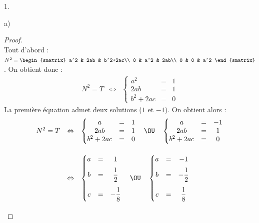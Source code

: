 \documentclass[11pt]{article}%
\begin{document}
\begin{noliste}{1.}
\begin{noliste}{a)}
    \begin{proof}~\\
      Tout d'abord : $N^2=
      \begin{smatrix}
        a^2 &  2ab &  b^2+2ac\\ 
        0 &  a^2 &  2ab\\ 
        0 &  0 &  a^2 
      \end{smatrix}$. On obtient donc :
      \[
      \begin{array}{rcl}
        N^2=T & \Leftrightarrow & \left\{
          \begin{matrix}
            a^2 & = & 1\\
            2ab & = & 1\\
            b^2+2ac & = & 0
          \end{matrix}
        \right.
      \end{array}
      \]
      La première équation admet deux solutions ($1$ et $-1$). On 
      obtient alors :~\\[-.2cm]
      \[
      \begin{array}{rcl}
        N^2=T & \Leftrightarrow & \left\{
          \begin{matrix}
            a & = & 1\\
            2ab & = &  1\\
            b^2+2ac & = & 0
          \end{matrix}
        \right. \quad \OU \quad \left\{
          \begin{matrix}
            a & = &  -1\\
            2ab & = & 1\\
            b^2+2ac & = &  0
          \end{matrix}
        \right.
        \\[1cm]
        & \Leftrightarrow & \left\{
          \begin{matrix}
            a & = & 1\\[.2cm]
            b & = & \dfrac{1}{2}\\[.4cm]
            c & = & -\dfrac{1}{8}
          \end{matrix}
        \right. \quad \OU \quad \left\{
          \begin{matrix}
            a & = &  -1\\[.2cm]
            b & = & -\dfrac{1}{2}\\[.4cm]
            c & = & \dfrac{1}{8}
          \end{matrix}
        \right.
        \\[1.2cm]

\end{array}\]
\end{proof}
\end{noliste}
\end{noliste}
\end{document}
